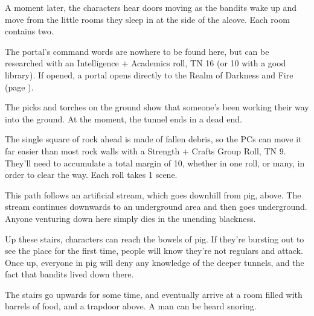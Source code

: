 \begin{multicols}{2}
A moment later, the characters hear doors moving as the bandits wake up and move from the little rooms they sleep in at the side of the alcove.  Each room contains two.

The portal's command words are nowhere to be found here, but can be researched with an Intelligence + Academics roll, TN 16 (or 10 with a good library).  If opened, a portal opens directly to the Realm of Darkness and Fire (page \pageref{darknessandfire}).


\sewerking


\begin{boxtext}
	The picks and torches on the ground show that someone's been working their way into the ground.  At the moment, the tunnel ends in a dead end.
\end{boxtext}
 
The single square of rock ahead is made of fallen debris, so the PCs can move it far easier than most rock walls with a Strength + Crafts Group Roll, TN 9.%
\iftoggle{core}%
{\footnote{See the core rules, page \pageref{grouproll}, for Group Rolls.}}%
{}
They'll need to accumulate a total margin of 10, whether in one roll, or many, in order to clear the way.
Each roll takes 1 scene.

\label{pigexit}

\label{slidein}

This path follows an artificial stream, which goes downhill from \gls{pig}, above.
The stream continues downwards to an underground area and then goes underground.
Anyone venturing down here simply dies in the unending blackness.


Up these stairs, characters can reach the bowels of \gls{pig}.
If they're bursting out to see the place for the first time, people will know they're not regulars and attack.
Once up, everyone in \gls{pig} will deny any knowledge of the deeper tunnels, and the fact that bandits lived down there.


\begin{boxtext}

	The stairs go upwards for some time, and eventually arrive at a room filled with barrels of food, and a trapdoor above.  A man can be heard snoring.


\end{boxtext}
\end{multicols}
